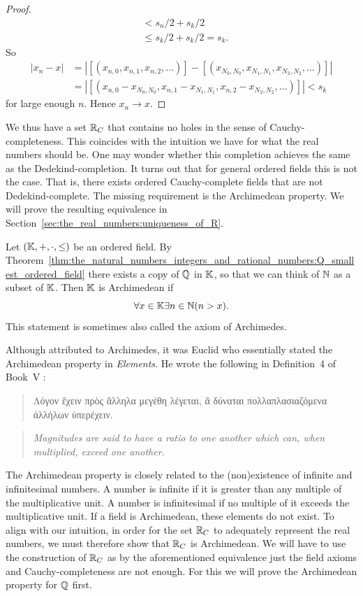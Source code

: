 \documentclass[../main.tex]{subfiles}
\begin{document}
\begin{proof}
\begin{align*}
        & <s_n/2+s_k/2 \\
        & \leq s_k/2+s_k/2=s_k.
    \end{align*}
    So 
    \begin{align*}
        \vert x_n-x\vert & =\left\vert[(x_{n,0},x_{n,1},x_{n,2},\dots)]-[(x_{N_0,N_0},x_{N_1,N_1},x_{N_2,N_2},\dots)]\right\vert \\
        & =\left\vert[(x_{n,0}-x_{N_0,N_0},x_{n,1}-x_{N_1,N_1},x_{n,2}-x_{N_2,N_2},\dots)]\right\vert<s_k
    \end{align*}
    for large enough $n$. Hence $x_n\to x$.
\end{proof}
We thus have a set $\mathbb{R}_C$ that contains no holes in the sense of Cauchy-completeness. This coincides with the intuition we have for what the real numbers should be. One may wonder whether this completion achieves the same as the Dedekind-completion. It turns out that for general ordered fields this is not the case. That is, there exists ordered Cauchy-complete fields that are not Dedekind-complete. The missing requirement is the Archimedean property. We will prove the resulting equivalence in Section~\ref{sec:the_real_numbers:uniqueness_of_R}.
\begin{definition}
    Let $(\mathbb{K},+,\cdot,\leq)$ be an ordered field. By Theorem~\ref{thm:the_natural_numbers_integers_and_rational_numbers:Q_smallest_ordered_field} there exists a copy of $\mathbb{Q}$ in $\mathbb{K}$, so that we can think of $\mathbb{N}$ as a subset of $\mathbb{K}$. Then $\mathbb{K}$ is Archimedean if
    \begin{equation*}
        \forall x\in\mathbb{K}\exists n\in\mathbb{N}(n>x).
    \end{equation*}
    This statement is sometimes also called the axiom of Archimedes.
\end{definition}
Although attributed to Archimedes, it was Euclid who essentially stated the Archimedean property in \textit{Elements}. He wrote the following in Definition~4 of Book~V \cite{Heath1926}:
\begin{quote}
    \textgreek{Λόγον ἔχειν πρὸς ἄλληλα μεγέθη λέγεται, ἃ δύναται πολλαπλασιαζόμενα ἀλλήλων ὑπερέχειν.}
\end{quote}
\begin{quote}
    \textit{Magnitudes are said to have a ratio to one another which can, when multiplied, exceed one another.}
\end{quote}
The Archimedean property is closely related to the (non)existence of infinite and infinitesimal numbers. A number is infinite if it is greater than any multiple of the multiplicative unit. A number is infinitesimal if no multiple of it exceeds the multiplicative unit. If a field is Archimedean, these elements do not exist. To align with our intuition, in order for the set $\mathbb{R}_C$ to adequately represent the real numbers, we must therefore show that $\mathbb{R}_C$ is Archimedean. We will have to use the construction of $\mathbb{R}_C$ as by the aforementioned equivalence just the field axioms and Cauchy-completeness are not enough. For this we will prove the Archimedean property for $\mathbb{Q}$ first.
\end{document}
